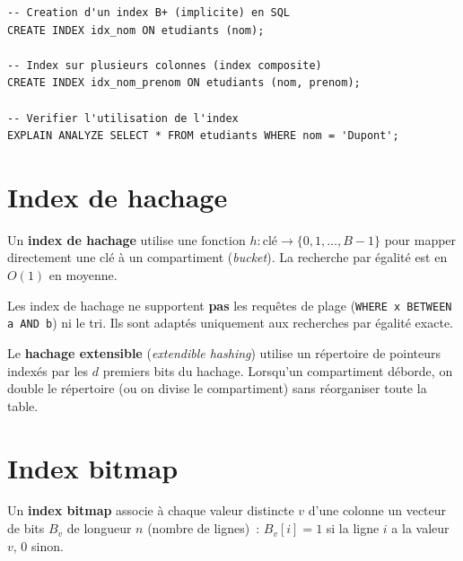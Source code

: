 \begin{verbatim}
-- Creation d'un index B+ (implicite) en SQL
CREATE INDEX idx_nom ON etudiants (nom);

-- Index sur plusieurs colonnes (index composite)
CREATE INDEX idx_nom_prenom ON etudiants (nom, prenom);

-- Verifier l'utilisation de l'index
EXPLAIN ANALYZE SELECT * FROM etudiants WHERE nom = 'Dupont';
\end{verbatim}

\section{Index de hachage}

\begin{definition}
Un \textbf{index de hachage} utilise une fonction $h : \text{cl\'e} \to
\{0, 1, \ldots, B-1\}$ pour mapper directement une cl\'e \`a un compartiment
(\emph{bucket}). La recherche par \'egalit\'e est en $O(1)$ en moyenne.
\end{definition}

\begin{remarque}
Les index de hachage ne supportent \textbf{pas} les requ\^etes de plage
(\texttt{WHERE x BETWEEN a AND b}) ni le tri. Ils sont adapt\'es uniquement
aux recherches par \'egalit\'e exacte.
\end{remarque}

\begin{definition}
Le \textbf{hachage extensible} (\emph{extendible hashing}) utilise un
r\'epertoire de pointeurs index\'es par les $d$ premiers bits du hachage.
Lorsqu'un compartiment d\'eborde, on double le r\'epertoire (ou on divise
le compartiment) sans r\'eorganiser toute la table.
\end{definition}

\section{Index bitmap}

\begin{definition}
Un \textbf{index bitmap} associe \`a chaque valeur distincte $v$ d'une
colonne un vecteur de bits $B_v$ de longueur $n$ (nombre de lignes)~:
$B_v[i] = 1$ si la ligne $i$ a la valeur $v$, 0 sinon.
\end{definition}

